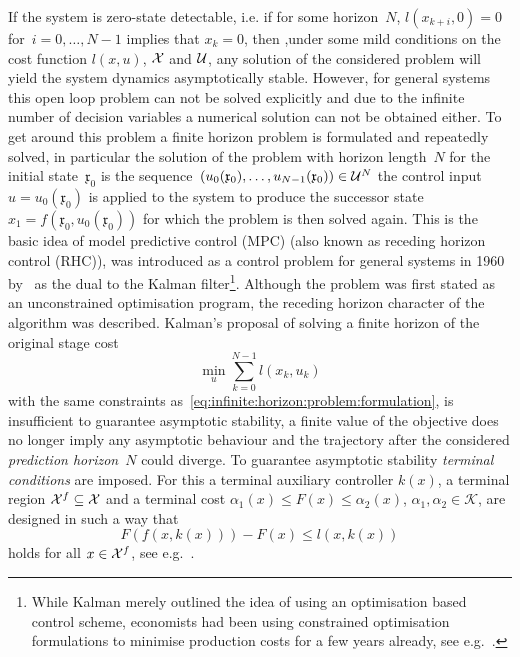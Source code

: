 %
If the system is zero-state detectable, i.e. if for some horizon~$N$, $l(x_{k+i},0)=0$ for~$i=0,\dots,N-1$ implies that $x_k=0$, then ,under some mild conditions on the cost function $l(x,u)$, $\mathcal X$ and $\mathcal U$, any solution of the considered problem will yield the system dynamics asymptotically stable. 
%
However, for general systems this open loop problem can not be solved explicitly and due to the infinite number of decision variables a numerical solution can not be obtained either.
%
To get around this problem a finite horizon problem is formulated and repeatedly solved, in particular the solution of the problem with horizon length~$N$ for the initial state~$\mathfrak{x}_0$ is the sequence~$(u_0(\mathfrak{x}_0),\dots,u_{N-1}(\mathfrak{x}_0))\in\mathcal U^N$ the control input~$u=u_0(\mathfrak{x}_0)$ is applied to the system to produce the successor state~$x_1=f(\mathfrak{x}_0,u_0(\mathfrak{x}_0))$ for which the problem is then solved again.
%
This is the basic idea of model predictive control (MPC) (also known as receding horizon control (RHC)), was introduced as a control problem for general systems in 1960 by~\cite{Kalman:1960} as the dual to the Kalman filter\footnote{While Kalman merely outlined the idea of using an optimisation based control scheme, economists had been using constrained optimisation formulations to minimise production costs for a few years already, see e.g.~\cite{Modigliani:1955,Johnson:1957,Wilde:1960}.}.
%
Although the problem was first stated as an unconstrained optimisation program, the receding horizon character of the algorithm was described.
%
Kalman's proposal of solving a finite horizon of the original stage cost
%
\begin{equation}
	\min_u \sum_{k=0}^{N-1}l(x_k,u_k)
\end{equation}
%
with the same constraints as~\eqref{eq:infinite:horizon:problem:formulation}, is insufficient to guarantee asymptotic stability, a finite value of the objective does no longer imply any asymptotic behaviour and the trajectory after the considered \emph{prediction horizon}~$N$ could diverge. 
%
To guarantee asymptotic stability \emph{terminal conditions} are imposed. 
%
For this a terminal auxiliary controller $k(x)$, a terminal region $\mathcal X^f\subseteq\mathcal X$ and a terminal cost $\alpha_1(x)\leq F(x)\leq\alpha_2(x)$, $\alpha_1,\alpha_2\in\mathscr K$, are designed in such a way that
%
\begin{equation}
	F(f(x,k(x)))-F(x) \leq l(x,k(x))
\end{equation}
%
holds for all $x\in\mathcal X^f$, see e.g.~\cite{Chen:1998}.

